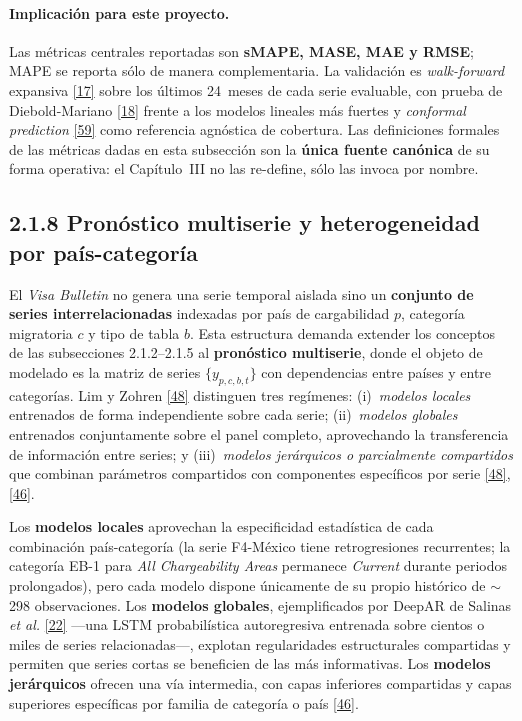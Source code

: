 \documentclass[12pt,letterpaper]{report}
\newcommand{\cita}[1]{\hyperref[bib:#1]{[#1]}}
\begin{document}
\paragraph{Implicación para este proyecto.} Las métricas centrales reportadas son \textbf{sMAPE, MASE, MAE y RMSE}; MAPE se reporta sólo de manera complementaria. La validación es \textit{walk-forward} expansiva \cita{17} sobre los últimos 24~meses de cada serie evaluable, con prueba de Diebold-Mariano \cita{18} frente a los modelos lineales más fuertes y \textit{conformal prediction} \cita{59} como referencia agnóstica de cobertura. Las definiciones formales de las métricas dadas en esta subsección son la \textbf{única fuente canónica} de su forma operativa: el Capítulo~III no las re-define, sólo las invoca por nombre.

\subsection{2.1.8 Pronóstico multiserie y heterogeneidad por país-categoría}

El \textit{Visa Bulletin} no genera una serie temporal aislada sino un \textbf{conjunto de series interrelacionadas} indexadas por país de cargabilidad $p$, categoría migratoria $c$ y tipo de tabla $b$. Esta estructura demanda extender los conceptos de las subsecciones 2.1.2--2.1.5 al \textbf{pronóstico multiserie}, donde el objeto de modelado es la matriz de series $\{y_{p,c,b,t}\}$ con dependencias entre países y entre categorías. Lim y Zohren \cita{48} distinguen tres regímenes: (i)~\textit{modelos locales} entrenados de forma independiente sobre cada serie; (ii)~\textit{modelos globales} entrenados conjuntamente sobre el panel completo, aprovechando la transferencia de información entre series; y (iii)~\textit{modelos jerárquicos o parcialmente compartidos} que combinan parámetros compartidos con componentes específicos por serie \cita{48}, \cita{46}.

Los \textbf{modelos locales} aprovechan la especificidad estadística de cada combinación país-categoría (la serie F4-México tiene retrogresiones recurrentes; la categoría EB-1 para \textit{All Chargeability Areas} permanece \textit{Current} durante periodos prolongados), pero cada modelo dispone únicamente de su propio histórico de $\sim$298 observaciones. Los \textbf{modelos globales}, ejemplificados por DeepAR de Salinas \textit{et al.} \cita{22} ---una LSTM probabilística autoregresiva entrenada sobre cientos o miles de series relacionadas---, explotan regularidades estructurales compartidas y permiten que series cortas se beneficien de las más informativas. Los \textbf{modelos jerárquicos} ofrecen una vía intermedia, con capas inferiores compartidas y capas superiores específicas por familia de categoría o país \cita{46}.
\end{document}
